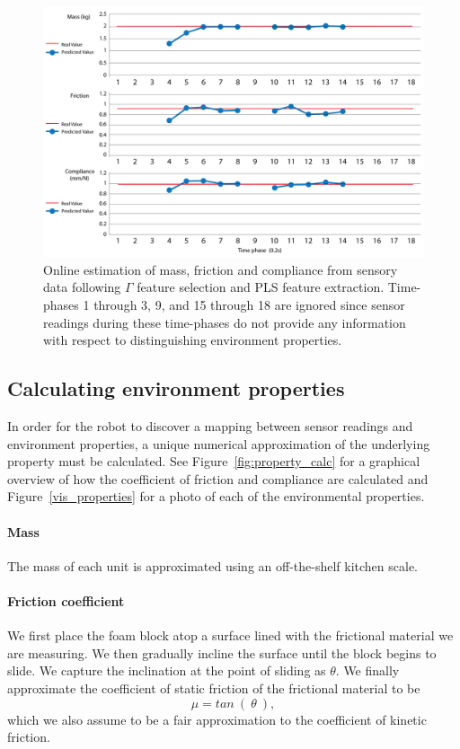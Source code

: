 \begin{figure}[]
	\centering
	\includegraphics[width=\linewidth]{images/online_mfc_vid}
	\caption{Online estimation of mass, friction and compliance from sensory data following $\Gamma$ feature selection and PLS feature extraction. Time-phases 1 through 3, 9, and 15 through 18 are ignored since sensor readings during these time-phases do not provide any information with respect to distinguishing environment properties.}
	\label{fig:online_mfc_vid}
\end{figure}

\subsection{Calculating environment properties}
\label{sec:property_calc_}
In order for the robot to discover a mapping between sensor readings and environment properties, a unique numerical approximation of the underlying property must be calculated.
See Figure~\ref{fig:property_calc} for a graphical overview of how the coefficient of friction and compliance are calculated and Figure~\ref{vis_properties} for a photo of each of the environmental properties.

\paragraph{Mass} 
The mass of each unit is approximated using an off-the-shelf kitchen scale.

\paragraph{Friction coefficient}
We first place the foam block atop a surface lined with the frictional material we are measuring. 
We then gradually incline the surface until the block begins to slide.
We capture the inclination at the point of sliding as $\theta$.
We finally approximate the coefficient of static friction of the frictional material to be 
$$
\mu = tan~(~\theta~), 
$$
which we also assume to be a fair approximation to the coefficient of kinetic friction.

